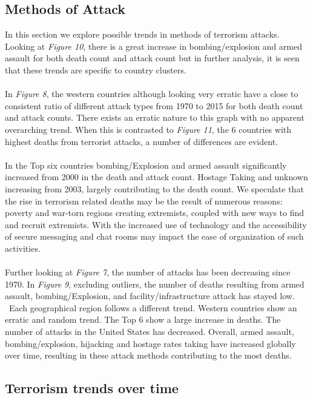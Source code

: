 \documentclass[10pt,a4paper]{article}
\begin{document}
\subsection{Methods of Attack}
In this section we explore possible trends in methods of terrorism attacks. Looking at \textit{Figure 10}, there is a great increase in bombing/explosion and armed assault for both death count and attack count but in further analysis, it is seen that these trends are specific to country clusters.
\\\\
In \textit{Figure 8}, the western countries although looking very erratic have a close to consistent ratio of different attack types from 1970 to 2015 for both death count and attack counts. There exists an erratic nature to this graph with no apparent overarching trend. When this is contrasted to \textit{Figure 11}, the 6 countries with highest deaths from terrorist attacks, a number of differences are evident.
\\\\
In the Top six countries bombing/Explosion and armed assault significantly increased from 2000 in the death and attack count. Hostage Taking and unknown increasing from 2003, largely contributing to the death count. 
We speculate that the rise in terrorism related deaths may be the result of numerous reasons: poverty and war-torn regions creating extremists, coupled with new ways to find and recruit extremists. With the increased use of technology and the accessibility of secure messaging and chat rooms may impact the ease of organization of such activities.
\\\\
Further looking at \textit{Figure 7}, the number of attacks has been decreasing since 1970. In \textit{Figure 9}, excluding outliers, the number of deaths resulting from armed assault, bombing/Explosion, and facility/infrastructure attack  has stayed low.
\\\
Each geographical region follows a different trend. Western countries show an erratic and random trend. The Top 6 show a large increase in deaths. The number of attacks in the United States has decreased. Overall, armed assault, bombing/explosion, hijacking and hostage rates taking have increased globally over time, resulting in these attack methods contributing to the most deaths.

\subsection{Terrorism trends over time}
\end{document}
